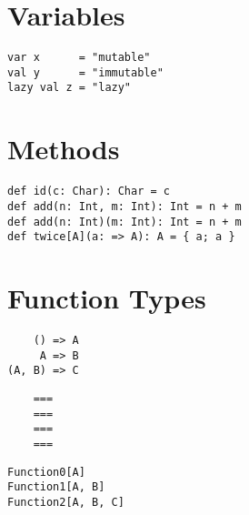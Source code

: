 \documentclass[10pt,landscape,a4paper]{article}
\begin{document}

\small
\begin{multicols*}{4}
  \section{Variables}
  \begin{verbatim}
var x      = "mutable"
val y      = "immutable"
lazy val z = "lazy"
\end{verbatim}

\section{Methods}
\begin{verbatim}
def id(c: Char): Char = c
def add(n: Int, m: Int): Int = n + m
def add(n: Int)(m: Int): Int = n + m
def twice[A](a: => A): A = { a; a }
\end{verbatim}

\section{Function Types}
\begin{center}
\begin{minipage}{0.25\linewidth}
\begin{verbatim}
    () => A
     A => B
(A, B) => C
\end{verbatim}
\end{minipage}
\begin{minipage}{0.25\linewidth}
  \begin{verbatim}
    ===
    ===
    ===
    ===
  \end{verbatim}
\end{minipage}
\begin{minipage}{0.4\linewidth}
\begin{verbatim}
Function0[A]
Function1[A, B]
Function2[A, B, C]
\end{verbatim}
\end{minipage}
\end{center}

\end{multicols*}
\end{document}
